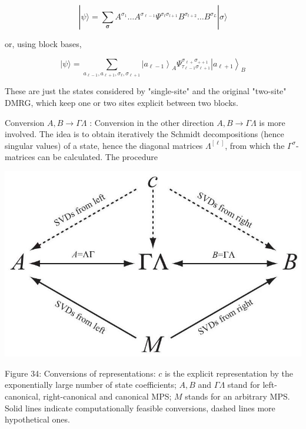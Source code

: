 \documentclass[12pt]{article}
\begin{document}
\begin{equation*}
|\psi\rangle=\sum_{\boldsymbol{\sigma}} A^{\sigma_{1}} \ldots A^{\sigma_{\ell-1}} \Psi^{\sigma_{t} \sigma_{l+1}} B^{\sigma_{t+2}} \ldots B^{\sigma_{L}}|\sigma\rangle \tag{174}
\end{equation*}


or, using block bases,


\begin{equation*}
|\psi\rangle=\sum_{a_{\ell-1}, a_{\ell+1}, \sigma_{\ell}, \sigma_{\ell+1}}\left|a_{\ell-1}\right\rangle_{A} \Psi_{\tau_{\ell-1} \sigma_{\ell+1}}^{\sigma_{\ell+} \sigma_{++1}}\left|a_{\ell+1}\right\rangle_{B} \tag{175}
\end{equation*}


These are just the states considered by "single-site" and the original "two-site" DMRG, which keep one or two sites explicit between two blocks.

Conversion $A, B \rightarrow \Gamma \Lambda$ : Conversion in the other direction $A, B \rightarrow \Gamma \Lambda$ is more involved. The idea is to obtain iteratively the Schmidt decompositions (hence singular values) of a state, hence the diagonal matrices $\Lambda^{[\ell]}$, from which the $\Gamma^{\sigma}$-matrices can be calculated. The procedure

\begin{center}
\includegraphics[max width=\textwidth]{2024_05_04_afc4ad226da9ccfe0ac8g-055}
\end{center}

Figure 34: Conversions of representations: $c$ is the explicit representation by the exponentially large number of state coefficients; $A, B$ and $\Gamma \Lambda$ stand for left-canonical, right-canonical and canonical MPS; $M$ stands for an arbitrary MPS. Solid lines indicate computationally feasible conversions, dashed lines more hypothetical ones.
\end{document}
